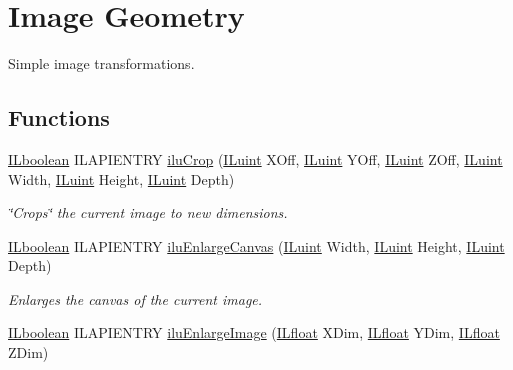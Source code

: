 \hypertarget{group__ilu__geometry}{\section{Image Geometry}
\label{group__ilu__geometry}
}


Simple image transformations.  


\subsection*{Functions}
\begin{DoxyCompactItemize}
\item 
\hyperlink{group__il__types_gaa6aa7c95cfdc06b4d8601ef832b7bb0a}{I\+Lboolean} I\+L\+A\+P\+I\+E\+N\+T\+R\+Y \hyperlink{group__ilu__geometry_ga80e4330e84ad8ec34c701e9b72c1ffed}{ilu\+Crop} (\hyperlink{group__il__types_gaff8e86a1072c8d7cfe387fb87c6ed8e1}{I\+Luint} X\+Off, \hyperlink{group__il__types_gaff8e86a1072c8d7cfe387fb87c6ed8e1}{I\+Luint} Y\+Off, \hyperlink{group__il__types_gaff8e86a1072c8d7cfe387fb87c6ed8e1}{I\+Luint} Z\+Off, \hyperlink{group__il__types_gaff8e86a1072c8d7cfe387fb87c6ed8e1}{I\+Luint} Width, \hyperlink{group__il__types_gaff8e86a1072c8d7cfe387fb87c6ed8e1}{I\+Luint} Height, \hyperlink{group__il__types_gaff8e86a1072c8d7cfe387fb87c6ed8e1}{I\+Luint} Depth)
\begin{DoxyCompactList}\small\item\em \char`\"{}\+Crops\char`\"{} the current image to new dimensions. \end{DoxyCompactList}\item 
\hyperlink{group__il__types_gaa6aa7c95cfdc06b4d8601ef832b7bb0a}{I\+Lboolean} I\+L\+A\+P\+I\+E\+N\+T\+R\+Y \hyperlink{group__ilu__geometry_gacba148d63e2e0da80b100c3ada950cb4}{ilu\+Enlarge\+Canvas} (\hyperlink{group__il__types_gaff8e86a1072c8d7cfe387fb87c6ed8e1}{I\+Luint} Width, \hyperlink{group__il__types_gaff8e86a1072c8d7cfe387fb87c6ed8e1}{I\+Luint} Height, \hyperlink{group__il__types_gaff8e86a1072c8d7cfe387fb87c6ed8e1}{I\+Luint} Depth)
\begin{DoxyCompactList}\small\item\em Enlarges the canvas of the current image. \end{DoxyCompactList}\item 
\hyperlink{group__il__types_gaa6aa7c95cfdc06b4d8601ef832b7bb0a}{I\+Lboolean} I\+L\+A\+P\+I\+E\+N\+T\+R\+Y \hyperlink{group__ilu__geometry_gaa9fe272b82b15ed2e52762e5e763b908}{ilu\+Enlarge\+Image} (\hyperlink{group__il__types_ga376156c9461893f4b1a5de9579dc86f2}{I\+Lfloat} X\+Dim, \hyperlink{group__il__types_ga376156c9461893f4b1a5de9579dc86f2}{I\+Lfloat} Y\+Dim, \hyperlink{group__il__types_ga376156c9461893f4b1a5de9579dc86f2}{I\+Lfloat} Z\+Dim)

\end{DoxyCompactItemize}
